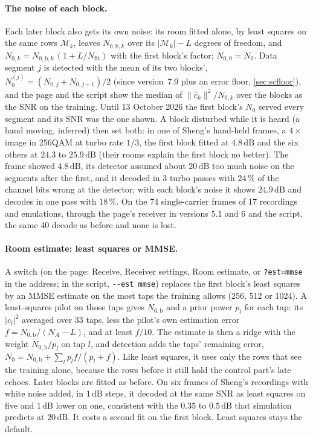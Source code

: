 \documentclass[11pt,a4paper]{article}
\newcommand{\dB}{\,\mathrm{dB}}
\newcommand{\code}[1]{\texttt{#1}}
\theoremstyle{remark}
\begin{document}
\paragraph{The noise of each block.}
Each later block also gets its own noise: its room fitted alone, by least squares on the same rows $\mathcal M_k$, leaves $N_{0,\mathrm b,k}$ over its $|\mathcal M_k| - L$ degrees of freedom, and $N_{0,k} = N_{0,\mathrm b,k}\,(1 + L/N_{\mathrm{fit}})$ with the first block's factor; $N_{0,0} = N_0$. Data segment $j$ is detected with the mean of its two blocks', $N_0^{(j)} = (N_{0,j} + N_{0,j+1})/2$ (since version~7.9 plus an error floor, \cref{sec:scfloor}), and the page and the script show the median of $\|\hat c_k\|^2/N_{0,k}$ over the blocks as the SNR on the training. Until 13 October 2026 the first block's $N_0$ served every segment and its SNR was the one shown. A block disturbed while it is heard (a hand moving, inferred) then set both: in one of Sheng's hand-held frames, a $4\times$ image in 256QAM at turbo rate $1/3$, the first block fitted at $4.8\dB$ and the six others at $24.3$ to $25.9\dB$ (their rooms explain the first block no better). The frame showed $4.8\dB$, its detector assumed about $20\dB$ too much noise on the segments after the first, and it decoded in 3 turbo passes with $24\,\%$ of the channel bits wrong at the detector; with each block's noise it shows $24.9\dB$ and decodes in one pass with $18\,\%$. On the 74 single-carrier frames of 17 recordings and emulations, through the page's receiver in versions 5.1 and 6 and the script, the same 40 decode as before and none is lost.

\paragraph{Room estimate: least squares or MMSE.}
A switch (on the page: Receive, Receiver settings, Room estimate, or \code{?est=mmse} in the address; in the script, \code{-{}-est mmse}) replaces the first block's least squares by an MMSE estimate on the most taps the training allows (256, 512 or 1024). A least-squares pilot on those taps gives $N_{0,\mathrm{b}}$ and a prior power $p_l$ for each tap: its $|c_l|^2$ averaged over 33 taps, less the pilot's own estimation error $f = N_{0,\mathrm{b}}/(N_A - L)$, and at least $f/10$. The estimate is then a ridge with the weight $N_{0,\mathrm{b}}/p_l$ on tap $l$, and detection adds the taps' remaining error, $N_0 = N_{0,\mathrm{b}} + \sum_l p_l f/(p_l + f)$. Like least squares, it uses only the rows that see the training alone, because the rows before it still hold the control part's late echoes. Later blocks are fitted as before. On six frames of Sheng's recordings with white noise added, in $1\dB$ steps, it decoded at the same SNR as least squares on five and $1\dB$ lower on one, consistent with the $0.35$ to $0.5\dB$ that simulation predicts at $20\dB$. It costs a second fit on the first block. Least squares stays the default.
\end{document}
